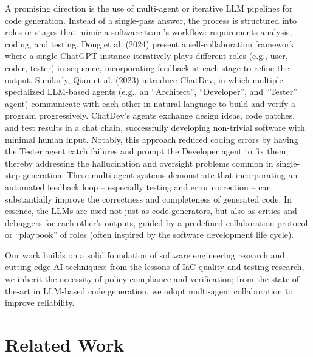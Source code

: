 \documentclass[acmsmall,screen,review,anonymous]{acmart}
\begin{document}
A promising direction is the use of multi-agent or iterative LLM pipelines for code generation. Instead of a single-pass answer, the process is structured into roles or stages that mimic a software team’s workflow: requirements analysis, coding, and testing. Dong et al. (2024) \cite{dong2024self} present a self-collaboration framework where a single ChatGPT instance iteratively plays different roles (e.g., user, coder, tester) in sequence, incorporating feedback at each stage to refine the output. Similarly, Qian et al. (2023) \cite{qian2023chatdev} introduce ChatDev, in which multiple specialized LLM-based agents (e.g., an “Architect”, “Developer”, and “Tester” agent) communicate with each other in natural language to build and verify a program progressively. ChatDev’s agents exchange design ideas, code patches, and test results in a chat chain, successfully developing non-trivial software with minimal human input. Notably, this approach reduced coding errors by having the Tester agent catch failures and prompt the Developer agent to fix them, thereby addressing the hallucination and oversight problems common in single-step generation. These multi-agent systems demonstrate that incorporating an automated feedback loop – especially testing and error correction – can substantially improve the correctness and completeness of generated code. In essence, the LLMs are used not just as code generators, but also as critics and debuggers for each other’s outputs, guided by a predefined collaboration protocol or “playbook” of roles (often inspired by the software development life cycle).

Our work builds on a solid foundation of software engineering research and cutting-edge AI techniques: from the lessons of IaC quality and testing research, we inherit the necessity of policy compliance and verification; from the state-of-the-art in LLM-based code generation, we adopt multi-agent collaboration to improve reliability.


\section{Related Work}
\end{document}
